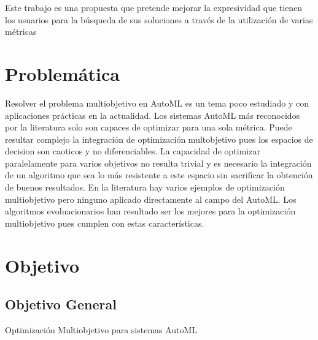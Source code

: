 Este trabajo es una propuesta que pretende mejorar la expresividad que tienen los usuarios para la b\'usqueda de sus soluciones a trav\'es de la utilizaci\'on de varias m\'etricas

\section*{Problem\'atica}
Resolver el problema multiobjetivo en AutoML es un tema poco estudiado y con aplicaciones pr\'acticas en la actualidad.
Los sistemas AutoML m\'as reconocidos por la literatura solo son capaces de optimizar para una sola m\'etrica. Puede resultar complejo la integraci\'on de optimizaci\'on multobjetivo pues los espacios de decision son caoticos y no diferenciables. La capacidad de optimizar paralelamente para varios objetivos no resulta trivial y es necesario la integraci\'on de un algoritmo que sea lo m\'as resistente a este espacio sin sacrificar la obtenci\'on de buenos resultados. En la literatura hay varios ejemplos de optimizaci\'on multiobjetivo pero ninguno aplicado directamente al campo del AutoML. Los algoritmos evoluacionarios han resultado ser los mejores para la optimizaci\'on multiobjetivo pues cumplen con estas caracter\'isticas.



 
\section*{Objetivo}
\subsection*{Objetivo General}
Optimizaci\'on Multiobjetivo para sistemas AutoML
